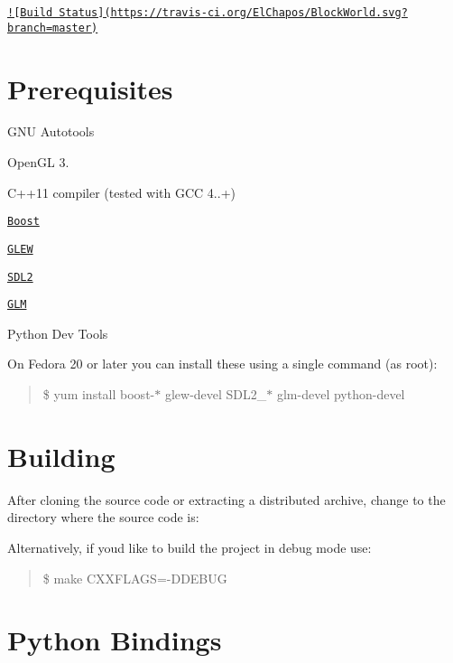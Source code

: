 \href{https://travis-ci.org/ElChapos/BlockWorld}{\tt !\mbox{[}Build Status\mbox{]}(https\+://travis-\/ci.\+org/\+El\+Chapos/\+Block\+World.\+svg?branch=master)}

\section*{Prerequisites}


\begin{DoxyItemize}
\item G\+N\+U Autotools
\item Open\+G\+L 3.
\item C++11 compiler (tested with G\+C\+C 4..+)
\item \href{http://www.boost.org/}{\tt Boost}
\item \href{http://glew.sourceforge.net/}{\tt G\+L\+E\+W}
\item \href{https://www.libsdl.org/}{\tt S\+D\+L2}
\item \href{http://glm.g-truc.net/}{\tt G\+L\+M}
\item Python Dev Tools
\end{DoxyItemize}

On Fedora 20 or later you can install these using a single command (as root)\+:

\begin{quote}
\$ yum install boost-\/$\ast$ glew-\/devel S\+D\+L2\+\_\+$\ast$ glm-\/devel python-\/devel \end{quote}


\section*{Building}

After cloning the source code or extracting a distributed archive, change to the directory where the source code is\+:




Alternatively, if you\textquotesingle{}d like to build the project in debug mode use\+:

\begin{quote}
\$ make C\+X\+X\+F\+L\+A\+G\+S=-\/\+D\+D\+E\+B\+U\+G \end{quote}


\section*{Python Bindings}


